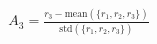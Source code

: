 \documentclass[preview]{standalone}
\begin{document}
\begin{align*}
A_3 = \frac{r_3 - \text{mean}\left(\{r_1, r_2, r_3\}\right)}{\text{std}\left(\{r_1, r_2, r_3\}\right)}
\end{align*}
\end{document}
